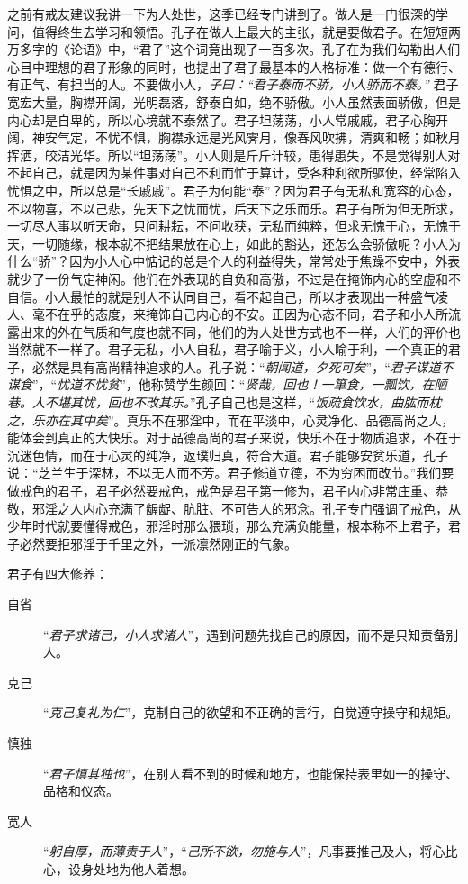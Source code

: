 之前有戒友建议我讲一下为人处世，这季已经专门讲到了。做人是一门很深的学问，值得终生去学习和领悟。孔子在做人上最大的主张，就是要做君子。在短短两万多字的《论语》中，“君子”这个词竟出现了一百多次。孔子在为我们勾勒出人们心目中理想的君子形象的同时，也提出了君子最基本的人格标准：做一个有德行、有正气、有担当的人。不要做小人，\textit{子曰：“君子泰而不骄，小人骄而不泰。”} 君子宽宏大量，胸襟开阔，光明磊落，舒泰自如，绝不骄傲。小人虽然表面骄傲，但是内心却是自卑的，所以心境就不泰然了。君子坦荡荡，小人常戚戚，君子心胸开阔，神安气定，不忧不惧，胸襟永远是光风霁月，像春风吹拂，清爽和畅；如秋月挥洒，皎洁光华。所以“坦荡荡”。小人则是斤斤计较，患得患失，不是觉得别人对不起自己，就是因为某件事对自己不利而忙于算计，受各种利欲所驱使，经常陷入忧惧之中，所以总是“长戚戚”。君子为何能“泰”？因为君子有无私和宽容的心态，不以物喜，不以己悲，先天下之忧而忧，后天下之乐而乐。君子有所为但无所求，一切尽人事以听天命，只问耕耘，不问收获，无私而纯粹，但求无愧于心，无愧于天，一切随缘，根本就不把结果放在心上，如此的豁达，还怎么会骄傲呢？小人为什么“骄”？因为小人心中惦记的总是个人的利益得失，常常处于焦躁不安中，外表就少了一份气定神闲。他们在外表现的自负和高傲，不过是在掩饰内心的空虚和不自信。小人最怕的就是别人不认同自己，看不起自己，所以才表现出一种盛气凌人、毫不在乎的态度，来掩饰自己内心的不安。正因为心态不同，君子和小人所流露出来的外在气质和气度也就不同，他们的为人处世方式也不一样，人们的评价也当然就不一样了。君子无私，小人自私，君子喻于义，小人喻于利，一个真正的君子，必然是具有高尚精神追求的人。孔子说：“\textit{朝闻道，夕死可矣}”，“\textit{君子谋道不谋食}”，“\textit{忧道不忧贫}”，他称赞学生颜回：“\textit{贤哉，回也！一箪食，一瓢饮，在陋巷。人不堪其忧，回也不改其乐。}”孔子自己也是这样，“\textit{饭疏食饮水，曲肱而枕之，乐亦在其中矣}”。真乐不在邪淫中，而在平淡中，心灵净化、品德高尚之人，能体会到真正的大快乐。对于品德高尚的君子来说，快乐不在于物质追求，不在于沉迷色情，而在于心灵的纯净，返璞归真，符合大道。君子能够安贫乐道，孔子说：“芝兰生于深林，不以无人而不芳。君子修道立德，不为穷困而改节。”我们要做戒色的君子，君子必然要戒色，戒色是君子第一修为，君子内心非常庄重、恭敬，邪淫之人内心充满了龌龊、肮脏、不可告人的邪念。孔子专门强调了戒色，从少年时代就要懂得戒色，邪淫时那么猥琐，那么充满负能量，根本称不上君子，君子必然要拒邪淫于千里之外，一派凛然刚正的气象。

君子有四大修养：\begin{adjustwidth}{-1em}{-1em}
    \begin{description}
        \item[自省] “\textit{君子求诸己，小人求诸人}”，遇到问题先找自己的原因，而不是只知责备别人。
        \item[克己] “\textit{克己复礼为仁}”，克制自己的欲望和不正确的言行，自觉遵守操守和规矩。
        \item[慎独] “\textit{君子慎其独也}”，在别人看不到的时候和地方，也能保持表里如一的操守、品格和仪态。
        \item[宽人] “\textit{躬自厚，而薄责于人}”，“\textit{己所不欲，勿施与人}”，凡事要推己及人，将心比心，设身处地为他人着想。
    \end{description}
\end{adjustwidth}

